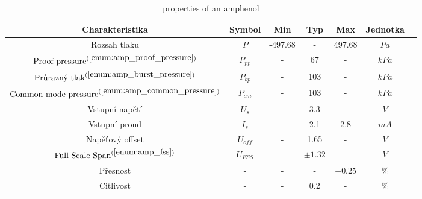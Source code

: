 \begin{table}[H]
    \label{tab:amphenol_properies}
    \caption{properties of an amphenol}
    \centering
    \begin{ctucolortab}
        \begin{tabular}{ccccccc}
            \toprule
            Charakteristika                                                         & Symbol    & Min     & Typ        & Max         & Jednotka & \\ \midrule
            Rozsah tlaku                                                            & $P$       & -497.68 & -          & 497.68      & $Pa$     & \\
            $\textnormal{Proof pressure}^{(\ref{enum:amp_proof_pressure})}$         & $P_{pp}$  & -       & 67         & -           & $kPa$    & \\
            $\textnormal{Průrazný tlak}^{(\ref{enum:amp_burst_pressure}) }$         & $P_{bp}$  & -       & 103        & -           & $kPa$    & \\
            $\textnormal{Common mode pressure}^{(\ref{enum:amp_common_pressure})} $ & $P_{cm}$  & -       & 103        & -           & $kPa$    & \\
            Vstupní napětí                                                          & $U_{s}$   & -       & 3.3        & -           & $V$      & \\
            Vstupní proud                                                           & $I_{s}$   & -       & 2.1        & 2.8         & $mA$     & \\
            Napěťový offset                                                         & $U_{off}$ & -       & 1.65       & -           & $V$      & \\
            $\textnormal{Full Scale Span}^{(\ref{enum:amp_fss})} $                  & $U_{FSS}$ &         & $\pm 1.32$ &             & $V$      & \\
            Přesnost                                                                & -         & -       & -          & $\pm 0.25 $ & $\%$     & \\
            Citlivost                                                               & -         & -       & 0.2        & -           & $\%$     & \\
            \bottomrule
        \end{tabular}
    \end{ctucolortab}
    \begin{enumerate}

\end{enumerate}
\end{table}
